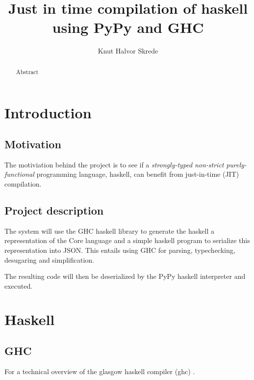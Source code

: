 \documentclass{article}
\begin{document}
\title{Just in time compilation of haskell using PyPy and GHC}
\author{Knut Halvor Skrede}
\maketitle

\begin{abstract}
Abstract
\end{abstract}


\tableofcontents

\clearpage

\setlength\LTleft{0pt}
\setlength\LTright{0pt}

\section{Introduction}

\subsection{Motivation}

The motiviation behind the project is to see if a \emph{strongly-typed} 
\emph{non-strict} \emph{purely-functional} programming language, haskell, 
can benefit from just-in-time (JIT) compilation.

\subsection{Project description}

The system will use the GHC haskell library to generate the haskell a 
representation of the Core language and a simple haskell program to 
serialize this representation into JSON. This entails using GHC for
parsing, typechecking, desugaring and simplification.

The resulting code will then be deserialized by the PyPy haskell interpreter 
and executed.

\section{Haskell}

\subsection{GHC}

For a technical overview of the glasgow haskell compiler (ghc) \cite{ghc}.
\end{document}
